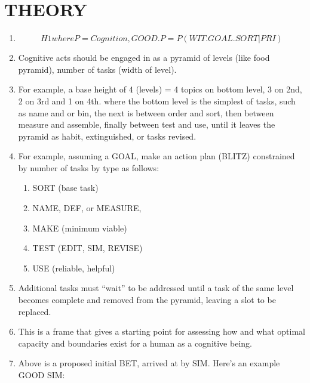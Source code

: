 \documentclass[
]{book}
\providecommand{\tightlist}{%
  \setlength{\itemsep}{0pt}\setlength{\parskip}{0pt}}
\begin{document}
\hypertarget{theory}{%
\section{THEORY}\label{theory}}

\begin{enumerate}
\def\labelenumi{\arabic{enumi}.}
\setcounter{enumi}{55}
\item
  \[ H1  
  where P = Cognition,
  GOOD.P = P(WIT.GOAL.SORT|PRI) \]
\item
  Cognitive acts should be engaged in as a pyramid of levels (like
  food pyramid), number of tasks (width of level).
\item
  For example, a base height of 4 (levels) = 4 topics on bottom level,
  3 on 2nd, 2 on 3rd and 1 on 4th. where the bottom level is the
  simplest of tasks, such as name and or bin, the next is between
  order and sort, then between measure and assemble, finally between
  test and use, until it leaves the pyramid as habit, extinguished, or
  tasks revised.
\item
  For example, assuming a GOAL, make an action plan (BLITZ)
  constrained by number of tasks by type as follows:

  \begin{enumerate}
  \def\labelenumii{\arabic{enumii}.}
  \tightlist
  \item
    SORT (base task)
  \item
    NAME, DEF, or MEASURE,
  \item
    MAKE (minimum viable)
  \item
    TEST (EDIT, SIM, REVISE)
  \item
    USE (reliable, helpful)
  \end{enumerate}
\item
  Additional tasks must ``wait'' to be addressed until a task of the
  same level becomes complete and removed from the pyramid, leaving a
  slot to be replaced.
\item
  This is a frame that gives a starting point for assessing how and
  what optimal capacity and boundaries exist for a human as a
  cognitive being.
\item
  Above is a proposed initial BET, arrived at by SIM. Here's an
  example GOOD SIM:


\end{enumerate}
\end{document}
